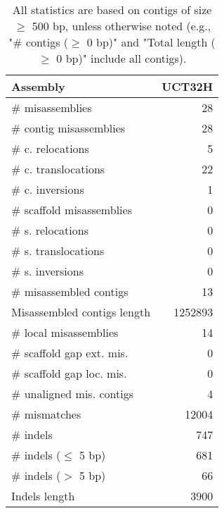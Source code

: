 \documentclass[12pt,a4paper]{article}
\begin{document}
\begin{table}[ht]
\begin{center}
\caption{All statistics are based on contigs of size $\geq$ 500 bp, unless otherwise noted (e.g., "\# contigs ($\geq$ 0 bp)" and "Total length ($\geq$ 0 bp)" include all contigs).}
\begin{tabular}{|l*{1}{|r}|}
\hline
Assembly & UCT32H \\ \hline
\# misassemblies & 28 \\ \hline
\hspace{2mm}\# contig misassemblies & 28 \\ \hline
\hspace{5mm}\# c. relocations & 5 \\ \hline
\hspace{5mm}\# c. translocations & 22 \\ \hline
\hspace{5mm}\# c. inversions & 1 \\ \hline
\hspace{2mm}\# scaffold misassemblies & 0 \\ \hline
\hspace{5mm}\# s. relocations & 0 \\ \hline
\hspace{5mm}\# s. translocations & 0 \\ \hline
\hspace{5mm}\# s. inversions & 0 \\ \hline
\# misassembled contigs & 13 \\ \hline
Misassembled contigs length & 1252893 \\ \hline
\# local misassemblies & 14 \\ \hline
\# scaffold gap ext. mis. & 0 \\ \hline
\# scaffold gap loc. mis. & 0 \\ \hline
\# unaligned mis. contigs & 4 \\ \hline
\# mismatches & 12004 \\ \hline
\# indels & 747 \\ \hline
\hspace{5mm}\# indels ($\leq$ 5 bp) & 681 \\ \hline
\hspace{5mm}\# indels ($>$ 5 bp) & 66 \\ \hline
Indels length & 3900 \\ \hline
\end{tabular}
\end{center}
\end{table}
\end{document}
